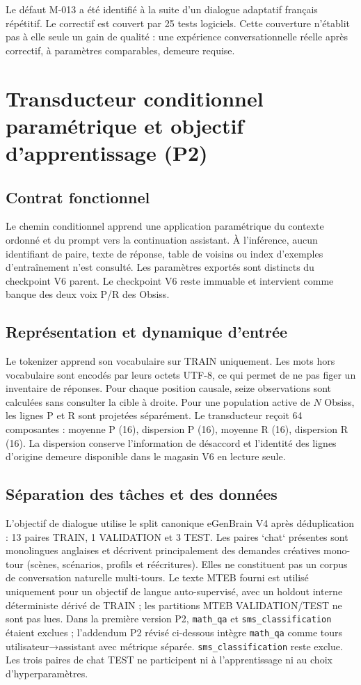 \documentclass[11pt,a4paper]{report}
\begin{document}
Le défaut M-013 a été identifié à la suite d'un dialogue adaptatif français répétitif. Le correctif est couvert par 25 tests logiciels. Cette couverture n'établit pas à elle seule un gain de qualité : une expérience conversationnelle réelle après correctif, à paramètres comparables, demeure requise.



\chapter{Transducteur conditionnel paramétrique et objectif d'apprentissage (P2)}
\section{Contrat fonctionnel}
Le chemin conditionnel apprend une application paramétrique du contexte ordonné et du prompt vers la continuation assistant. À l'inférence, aucun identifiant de paire, texte de réponse, table de voisins ou index d'exemples d'entraînement n'est consulté. Les paramètres exportés sont distincts du checkpoint V6 parent. Le checkpoint V6 reste immuable et intervient comme banque des deux voix P/R des Obsiss.

\section{Représentation et dynamique d'entrée}
Le tokenizer apprend son vocabulaire sur TRAIN uniquement. Les mots hors vocabulaire sont encodés par leurs octets UTF-8, ce qui permet de ne pas figer un inventaire de réponses. Pour chaque position causale, seize observations sont calculées sans consulter la cible à droite. Pour une population active de $N$ Obsiss, les lignes P et R sont projetées séparément. Le transducteur reçoit 64 composantes : moyenne P (16), dispersion P (16), moyenne R (16), dispersion R (16). La dispersion conserve l'information de désaccord et l'identité des lignes d'origine demeure disponible dans le magasin V6 en lecture seule.

\section{Séparation des tâches et des données}
L'objectif de dialogue utilise le split canonique eGenBrain V4 après déduplication : 13 paires TRAIN, 1 VALIDATION et 3 TEST. Les paires `chat` présentes sont monolingues anglaises et décrivent principalement des demandes créatives mono-tour (scènes, scénarios, profils et réécritures). Elles ne constituent pas un corpus de conversation naturelle multi-tours. Le texte MTEB fourni est utilisé uniquement pour un objectif de langue auto-supervisé, avec un holdout interne déterministe dérivé de TRAIN ; les partitions MTEB VALIDATION/TEST ne sont pas lues. Dans la première version P2, \texttt{math\_qa} et \texttt{sms\_classification} étaient exclues ; l’addendum P2 révisé ci-dessous intègre \texttt{math\_qa} comme tours utilisateur→assistant avec métrique séparée. \texttt{sms\_classification} reste exclue. Les trois paires de chat TEST ne participent ni à l'apprentissage ni au choix d'hyperparamètres.
\end{document}
